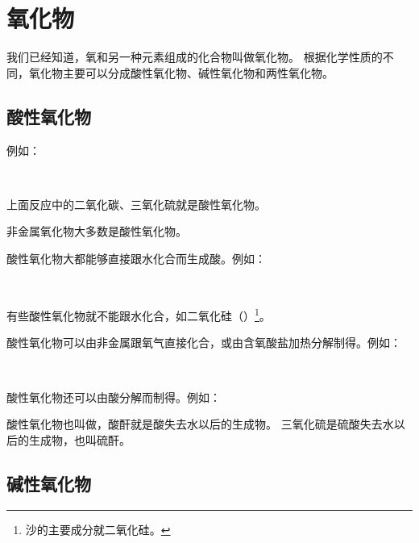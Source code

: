 \section{氧化物}\label{sec:5-8}

我们已经知道，氧和另一种元素组成的化合物叫做氧化物。
根据化学性质的不同，氧化物主要可以分成酸性氧化物、碱性氧化物和两性氧化物。


\subsection{酸性氧化物}

例如：
\begin{fangchengshi}
     \\[-.8em]
\end{fangchengshi}

上面反应中的二氧化碳、三氧化硫就是酸性氧化物。

非金属氧化物大多数是酸性氧化物。

酸性氧化物大都能够直接跟水化合而生成酸。例如：
\begin{fangchengshi}
     \\[-.8em]
\end{fangchengshi}

有些酸性氧化物就不能跟水化合，如二氧化硅（）\footnote{沙的主要成分就二氧化硅。}。

酸性氧化物可以由非金属跟氧气直接化合，或由含氧酸盐加热分解制得。例如：
\begin{fangchengshi}
     \\[-.8em]
\end{fangchengshi}

酸性氧化物还可以由酸分解而制得。例如：
\begin{fangchengshi}
\end{fangchengshi}

酸性氧化物也叫做，酸酐就是酸失去水以后的生成物。
三氧化硫是硫酸失去水以后的生成物，也叫硫酐。



\subsection{碱性氧化物}

